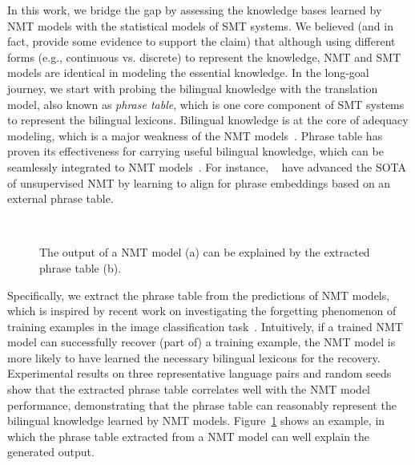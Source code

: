 \documentclass[11pt,a4paper]{article}
\begin{document}
In this work, we bridge the gap by assessing the knowledge bases learned by NMT models with the statistical models of SMT systems.
We believed (and in fact, provide some evidence to support the claim) that although using different forms (e.g., continuous vs. discrete) to represent the knowledge, NMT and SMT models are identical in modeling the essential knowledge. 
In the long-goal journey, we start with probing the bilingual knowledge with the translation model, also known as {\em phrase table}, which is one core component of SMT systems to represent the bilingual lexicons.
Bilingual knowledge is at the core of adequacy modeling, which is a major weakness of the NMT models~\cite{Tu_2016}.
Phrase table has proven its effectiveness for carrying useful bilingual knowledge, which can be seamlessly integrated to NMT models~\cite{Wang:2018:TASLP,lample2018phrase}. For instance, ~ have advanced the SOTA of unsupervised NMT by learning to align for phrase embeddings based on an external phrase table.


\begin{figure}
    \centering
     \\
    \caption{The output of a NMT model (a) can be explained by the extracted phrase table (b). } 
    \label{fig:example}
\end{figure}


Specifically, we extract the phrase table from the predictions of NMT models, which is inspired by recent work on investigating the forgetting phenomenon of training examples in the image classification task~\cite{toneva:2018:empirical}. Intuitively, if a trained NMT model can successfully recover (part of) a training example, the NMT model is more likely to have learned the necessary bilingual lexicons for the recovery. 
Experimental results on three representative language pairs and random seeds show that the extracted phrase table correlates well with the NMT model performance, demonstrating that the phrase table can reasonably represent the bilingual knowledge learned by NMT models.
Figure~\ref{fig:example} shows an example, in which the phrase table extracted from a NMT model can well explain the generated output. 
\end{document}
